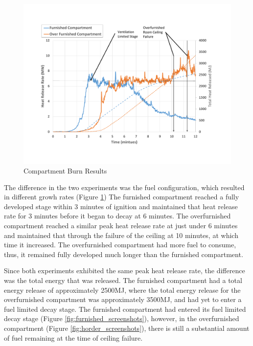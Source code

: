 \documentclass{article}
\begin{document}
\begin{figure}[H]
	\centering
	\includegraphics[width=\textwidth]{0_Images/Vent_Limited_Room/Compartment_Burn_Chart.pdf}
	\caption{Compartment Burn Results}
	\label{fig:comp_burn_chart}
\end{figure}

The difference in the two experiments was the fuel configuration, which resulted in different growh rates (Figure \ref{fig:comp_burn_chart}) The furnished compartment reached a fully developed stage within 3 minutes of ignition and maintained that heat release rate for 3 minutes before it began to decay at 6 minutes. The overfurnished compartment reached a similar peak heat release rate at just under 6 minutes and maintained that through the failure of the ceiling at 10 minutes, at which time it increased. The overfurnished compartment had more fuel to consume, thus, it remained fully developed much longer than the furnished compartment. 

Since both experiments exhibited the same peak heat release rate, the difference was the total energy that was released. The furnished compartment had a total energy release of approximately 2500MJ, where the total energy release for the overfurnished compartment was approximately 3500MJ, and had yet to enter a fuel limited decay stage. The furnished compartment had entered its fuel limited decay stage (Figure \ref{fig:furnished_screenshots}), however, in the overfurnished compartment (Figure \ref{fig:horder_screenshots}), there is still a substantial amount of fuel remaining at the time of ceiling failure. 
\end{document}
